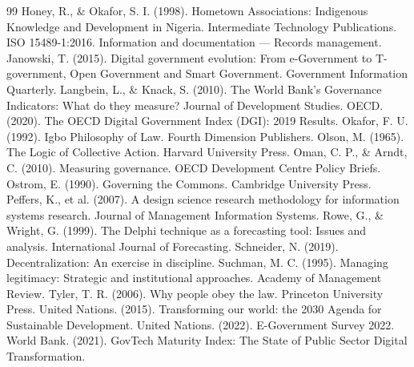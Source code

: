 \documentclass[sigconf]{acmart}
\begin{document}
\begin{thebibliography}{99}
 Honey, R., \& Okafor, S. I. (1998). Hometown Associations: Indigenous Knowledge and Development in Nigeria. Intermediate Technology Publications.
 ISO 15489-1:2016. Information and documentation — Records management.
 Janowski, T. (2015). Digital government evolution: From e-Government to T-government, Open Government and Smart Government. Government Information Quarterly.
 Langbein, L., \& Knack, S. (2010). The World Bank’s Governance Indicators: What do they measure? Journal of Development Studies.
 OECD. (2020). The OECD Digital Government Index (DGI): 2019 Results.
 Okafor, F. U. (1992). Igbo Philosophy of Law. Fourth Dimension Publishers.
 Olson, M. (1965). The Logic of Collective Action. Harvard University Press.
 Oman, C. P., \& Arndt, C. (2010). Measuring governance. OECD Development Centre Policy Briefs.
 Ostrom, E. (1990). Governing the Commons. Cambridge University Press.
 Peffers, K., et al. (2007). A design science research methodology for information systems research. Journal of Management Information Systems.
 Rowe, G., \& Wright, G. (1999). The Delphi technique as a forecasting tool: Issues and analysis. International Journal of Forecasting.
 Schneider, N. (2019). Decentralization: An exercise in discipline.
 Suchman, M. C. (1995). Managing legitimacy: Strategic and institutional approaches. Academy of Management Review.
 Tyler, T. R. (2006). Why people obey the law. Princeton University Press.
 United Nations. (2015). Transforming our world: the 2030 Agenda for Sustainable Development.
 United Nations. (2022). E-Government Survey 2022.
 World Bank. (2021). GovTech Maturity Index: The State of Public Sector Digital Transformation.

\end{thebibliography}
\end{document}
